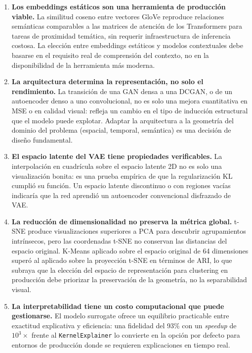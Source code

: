 \documentclass[12pt, a4paper]{article}
\begin{document}
\begin{enumerate}[leftmargin=*, label=\textbf{\arabic*.}]

  \item \textbf{Los embeddings estáticos son una herramienta de producción viable.} La similitud coseno entre vectores GloVe reproduce relaciones semánticas comparables a las matrices de atención de los Transformers para tareas de proximidad temática, sin requerir infraestructura de inferencia costosa. La elección entre embeddings estáticos y modelos contextuales debe basarse en el requisito real de comprensión del contexto, no en la disponibilidad de la herramienta más moderna.

  \item \textbf{La arquitectura determina la representación, no solo el rendimiento.} La transición de una GAN densa a una DCGAN, o de un autoencoder denso a uno convolucional, no es solo una mejora cuantitativa en MSE o en calidad visual: refleja un cambio en el tipo de inducción estructural que el modelo puede explotar. Adaptar la arquitectura a la geometría del dominio del problema (espacial, temporal, semántica) es una decisión de diseño fundamental.

  \item \textbf{El espacio latente del VAE tiene propiedades verificables.} La interpolación en cuadrícula sobre el espacio latente 2D no es solo una visualización bonita: es una prueba empírica de que la regularización KL cumplió su función. Un espacio latente discontinuo o con regiones vacías indicaría que la red aprendió un autoencoder convencional disfrazado de VAE.

  \item \textbf{La reducción de dimensionalidad no preserva la métrica global.} t-SNE produce visualizaciones superiores a PCA para descubrir agrupamientos intrínsecos, pero las coordenadas t-SNE no conservan las distancias del espacio original. K-Means aplicado sobre el espacio original de 64 dimensiones superó al aplicado sobre la proyección t-SNE en términos de ARI, lo que subraya que la elección del espacio de representación para clustering en producción debe priorizar la preservación de la geometría, no la separabilidad visual.

  \item \textbf{La interpretabilidad tiene un costo computacional que puede gestionarse.} El modelo surrogate ofrece un equilibrio practicable entre exactitud explicativa y eficiencia: una fidelidad del 93\% con un \textit{speedup} de $10^3\times$ frente al \texttt{KernelExplainer} lo convierte en la opción por defecto para entornos de producción donde se requieren explicaciones en tiempo real.


\end{enumerate}
\end{document}
